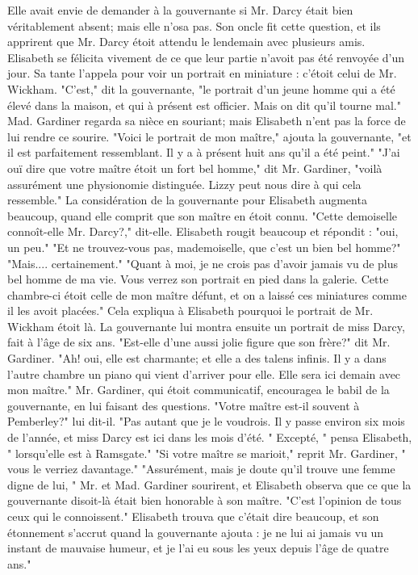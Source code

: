 Elle avait envie de demander à la gouvernante si Mr. Darcy était bien véritablement absent; mais elle n'osa pas. Son oncle fit cette question, et ils apprirent que\setcounter{page}{102} Mr. Darcy étoit attendu le lendemain avec plusieurs amis. Elisabeth se félicita vivement de ce que leur partie n'avoit pas été renvoyée d'un jour.
Sa tante l'appela pour voir un portrait en miniature : c'étoit celui de Mr. Wickham.
"C'est," dit la gouvernante, "le portrait d'un jeune homme qui a été élevé dans la maison, et qui à présent est officier. Mais on dit qu'il tourne mal."
Mad. Gardiner regarda sa nièce en souriant; mais Elisabeth n'ent pas la force de lui rendre ce sourire.
"Voici le portrait de mon maître," ajouta la gouvernante, "et il est parfaitement ressemblant. Il y a à présent huit ans qu'il a été peint."
"J'ai ouï dire que votre maître étoit un fort bel homme," dit Mr. Gardiner, "voilà assurément une physionomie distinguée. Lizzy peut nous dire à qui cela ressemble."
La considération de la gouvernante pour Elisabeth augmenta beaucoup, quand elle comprit que son maître en étoit connu.
"Cette demoiselle connoît-elle Mr. Darcy?," dit-elle.
Elisabeth rougit beaucoup et répondit : "oui, un peu."
"Et ne trouvez-vous pas, mademoiselle, que c'est un bien bel homme?"
\setcounter{page}{103}
"Mais.... certainement."
"Quant à moi, je ne crois pas d'avoir jamais vu de plus bel homme de ma vie. Vous verrez son portrait en pied dans la galerie. Cette chambre-ci étoit celle de mon maître défunt, et on a laissé ces miniatures comme il les avoit placées."
Cela expliqua à Elisabeth pourquoi le portrait de Mr. Wickham étoit là.
La gouvernante lui montra ensuite un portrait de miss Darcy, fait à l'âge de six ans.
"Est-elle d'une aussi jolie figure que son frère?" dit Mr. Gardiner.
"Ah! oui, elle est charmante; et elle a des talens infinis. Il y a dans l'autre chambre un piano qui vient d'arriver pour elle. Elle sera ici demain avec mon maître."
Mr. Gardiner, qui étoit communicatif, encouragea le babil de la gouvernante, en lui faisant des questions. "Votre maître est-il souvent à Pemberley?" lui dit-il.
"Pas autant que je le voudrois. Il y passe environ six mois de l'année, et miss Darcy est ici dans les mois d'été. " Excepté, " pensa Elisabeth, " lorsqu'elle est à Ramsgate."
"Si votre maître se marioit," reprit Mr. Gardiner, " vous le verriez davantage."
"Assurément, mais je doute qu'il trouve une femme digne de lui, " Mr. et Mad.\setcounter{page}{104} Gardiner sourirent, et Elisabeth observa que ce que la gouvernante disoit-là était bien honorable à son maître.
"C'est l'opinion de tous ceux qui le connoissent." Elisabeth trouva que c'était dire beaucoup, et son étonnement s'accrut quand la gouvernante ajouta : je ne lui ai jamais vu un instant de mauvaise humeur, et je l'ai eu sous les yeux depuis l'âge de quatre ans."
